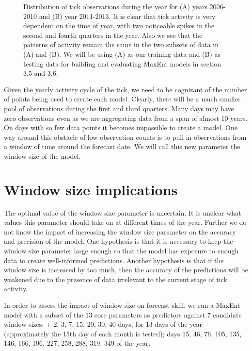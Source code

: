 \begin{figure} [!ht]
\centerline{}
\caption{Distribution of tick observations during the year for (A) years 2006-2010 and (B) year 2011-2013. It is clear that tick activity is very dependent on the time of year, with two noticeable spikes in the second and fourth quarters in the year. Also we see that the patterns of activity remain the same in the two subsets of data in (A) and (B). We will be using (A) as our training data and (B) as testing data for building and evaluating MaxEnt models in section 3.5 and 3.6.}
\label{fig6}
\end{figure}


\noindent Given the yearly activity cycle of the tick, we need to be cognizant of the number of points being used to create each model. Clearly, there will be a much smaller pool of observations during the first and third quarters. Many days may have zero observations even as we are aggregating data from a span of almost 10 years. On days with so few data points it becomes impossible to create a model. One way around this obstacle of low observation counts is to pull in observations from a window of time around the forecast date. We will call this new parameter the window size of the model. \newline

\section{Window size implications }

\noindent The optimal value of the window size parameter is uncertain. It is unclear what values this parameter should take on at different times of the year. Further we do not know the impact of increasing the window size parameter on the accuracy and precision of the model. One hypothesis is that it is necessary to keep the window size parameter large enough so that the model has exposure to enough data to create well-informed predictions. Another hypothesis is that if the window size is increased by too much, then the accuracy of the predictions will be weakened due to the presence of data irrelevant to the current stage of tick activity. \newline

\noindent In order to assess the impact of window size on forecast skill, we run a MaxEnt model with a subset of the 13 core parameters as predictors against 7 candidate window sizes: $\pm$ 2, 3, 7, 15, 20, 30, 40 days, for 13 days of the year (approximately the 15th day of each month is tested); days 15, 46, 76, 105, 135, 146, 166, 196, 227, 258, 288, 319, 349 of the year. \newline

